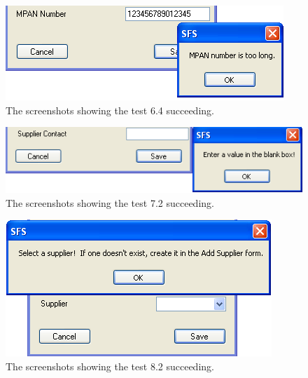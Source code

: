 \begin{figure}[ht]
\centering
\includegraphics[scale=0.5]{test6dot4}
\caption{The screenshots showing the test 6.4 succeeding.}
\label{fig:test_sixdotfour}
\end{figure}

\begin{figure}[ht]
\centering
\includegraphics[scale=0.5]{test7dot2}
\caption{The screenshots showing the test 7.2 succeeding.}
\label{fig:test_sevendottwo}
\end{figure}

\begin{figure}[ht]
\centering
\includegraphics[scale=0.5]{test8dot2}
\caption{The screenshots showing the test 8.2 succeeding.}
\label{fig:test_eightdottwo}
\end{figure}

